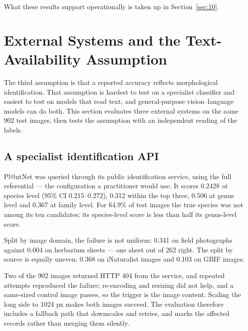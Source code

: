 \documentclass[preprint,12pt,authoryear]{elsarticle}
\begin{document}
What these results support operationally is taken up in Section~\ref{sec:10}.

\setcounter{section}{6}

\section{External Systems and the Text-Availability Assumption}\label{sec:7}

The third assumption is that a reported accuracy reflects morphological identification. That assumption is hardest to test on a specialist classifier and easiest to test on models that read text, and general-purpose vision--language models can do both. This section evaluates three external systems on the same 902 test images, then tests the assumption with an independent reading of the labels.

\setcounter{section}{7}

\setcounter{subsection}{0}

\subsection{A specialist identification API}\label{sec:7.1}

Pl@ntNet was queried through its public identification service, using the full referential --- the configuration a practitioner would use. It scores 0.2428 at species level (95\% CI 0.215--0.272), 0.312 within the top three, 0.506 at genus level and 0.367 at family level. For 64.9\% of test images the true species was not among its ten candidates; its species-level score is less than half its genus-level score.

Split by image domain, the failure is not uniform: 0.341 on field photographs against 0.004 on herbarium sheets --- one sheet out of 262 right. The split by source is equally uneven: 0.368 on iNaturalist images and 0.103 on GBIF images.

Two of the 902 images returned HTTP 404 from the service, and repeated attempts reproduced the failure; re-encoding and resizing did not help, and a same-sized control image passes, so the trigger is the image content. Scaling the long side to 1024 px makes both images succeed. The evaluation therefore includes a fallback path that downscales and retries, and marks the affected records rather than merging them silently.

\setcounter{section}{7}

\setcounter{subsection}{1}
\end{document}
